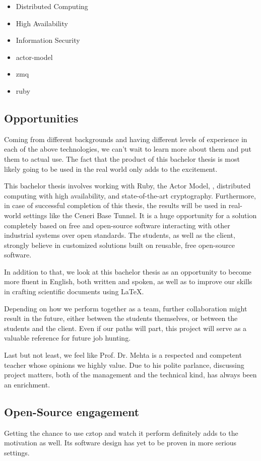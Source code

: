 \begin{itemize}
	\item Distributed Computing
	\item High Availability
	\item Information Security
	\item \gls{actor-model}
	\item \gls{zmq}
	\item \gls{ruby}
\end{itemize}

\subsection*{Opportunities}
Coming from different backgrounds and having different levels of experience in
each of the above technologies, we can't wait to learn more about them and put
them to actual use. The fact that the product of this bachelor thesis is most
likely going to be used in the real world only adds to the excitement.

This bachelor thesis involves working with Ruby, the Actor Model, \zmq,
distributed computing with high availability, and state-of-the-art
cryptography. Furthermore, in case of successful completion of this thesis, the results will be used in real-world settings like the Ceneri
Base Tunnel. It is a huge opportunity for a solution completely based on free
and open-source software interacting with other industrial systems over open standards. The students, as well as the client, strongly believe
in customized solutions built on reusable, free open-source software.

In addition to that, we look at this bachelor thesis as an opportunity to
become more fluent in English, both written and spoken, as well as to improve
our skills in crafting scientific documents using {\LaTeX}.

Depending on how we perform together as a team, further collaboration might
result in the future, either between the students themselves, or between the
students and the client. Even if our paths will part, this project will
serve as a valuable reference for future job hunting.

Last but not least, we feel like Prof. Dr. Mehta is a respected and competent
teacher whose opinions we highly value. Due to his polite parlance, discussing
project matters, both of the management and the technical kind, has always been
an enrichment.

\subsection{Open-Source engagement}
Getting the chance to use \gls{cztop} and watch it perform definitely adds to
the motivation as well. Its software design has yet to be proven in more
serious settings.

